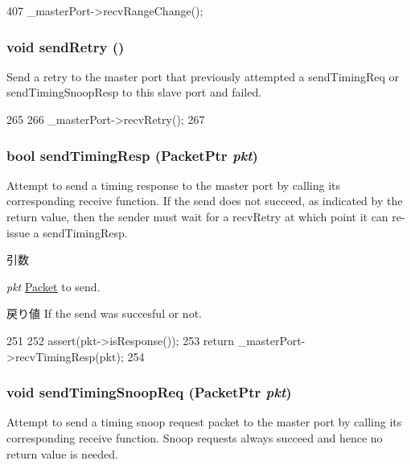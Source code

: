 \begin{DoxyCode}
407 { _masterPort->recvRangeChange(); }
\end{DoxyCode}
\hypertarget{classSlavePort_a6172657b944e32a722d90a20c5896bb7}{
\subsubsection[{sendRetry}]{\setlength{\rightskip}{0pt plus 5cm}void sendRetry ()}}
\label{classSlavePort_a6172657b944e32a722d90a20c5896bb7}
Send a retry to the master port that previously attempted a sendTimingReq or sendTimingSnoopResp to this slave port and failed. 


\begin{DoxyCode}
265 {
266     _masterPort->recvRetry();
267 }
\end{DoxyCode}
\hypertarget{classSlavePort_a0c021b2778a3358d110bd8700fe85732}{
\subsubsection[{sendTimingResp}]{\setlength{\rightskip}{0pt plus 5cm}bool sendTimingResp ({\bf PacketPtr} {\em pkt})}}
\label{classSlavePort_a0c021b2778a3358d110bd8700fe85732}
Attempt to send a timing response to the master port by calling its corresponding receive function. If the send does not succeed, as indicated by the return value, then the sender must wait for a recvRetry at which point it can re-\/issue a sendTimingResp.


\begin{DoxyParams}{引数}
\item[{\em pkt}]\hyperlink{classPacket}{Packet} to send.\end{DoxyParams}
\begin{DoxyReturn}{戻り値}
If the send was succesful or not. 
\end{DoxyReturn}



\begin{DoxyCode}
251 {
252     assert(pkt->isResponse());
253     return _masterPort->recvTimingResp(pkt);
254 }
\end{DoxyCode}
\hypertarget{classSlavePort_a44317ff11e2c240ae72ca2f5f1d9076d}{
\subsubsection[{sendTimingSnoopReq}]{\setlength{\rightskip}{0pt plus 5cm}void sendTimingSnoopReq ({\bf PacketPtr} {\em pkt})}}
\label{classSlavePort_a44317ff11e2c240ae72ca2f5f1d9076d}
Attempt to send a timing snoop request packet to the master port by calling its corresponding receive function. Snoop requests always succeed and hence no return value is needed.



